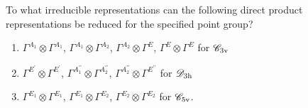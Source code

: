 \documentclass[a4paper]{book}
\begin{document}
	\setcounter{chapter}{8}

	\begin{exercise}
		To what irreducible representations can the following direct product representations be reduced for the specified point group?
		\begin{enumerate}[label=(\alph*)]
		\item $\Gamma^{A_1}\otimes\Gamma^{A_1}$, $\Gamma^{A_1}\otimes\Gamma^{A_2}$, $\Gamma^{A_2}\otimes\Gamma^{E}$, $\Gamma^{E}\otimes\Gamma^{E}$ for $\mathscr{C}_{\rm 3v}$
		\item $\Gamma^{E^\prime}\otimes\Gamma^{E^\prime}$, $\Gamma^{A^{\prime\prime}_1}\otimes\Gamma^{A^{\prime\prime}_2}$, $\Gamma^{A^{\prime\prime}_2}\otimes\Gamma^{E^{\prime\prime}}$ for $\mathscr{D}_{\rm 3h}$
		\item $\Gamma^{E_1}\otimes\Gamma^{E_1}$, $\Gamma^{E_1}\otimes\Gamma^{E_2}$, $\Gamma^{E_2}\otimes\Gamma^{E_2}$ for $\mathscr{C}_{\rm 5v}$.
		\end{enumerate}
	\end{exercise}
\end{document}
